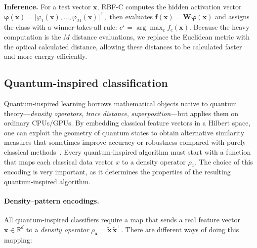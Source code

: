 \documentclass[twocolumn]{article} %
\begin{document}
\smallskip
\textbf{Inference.}
For a test vector \(\mathbf x\), RBF-C computes the hidden activation
vector
\(
  \boldsymbol\varphi(\mathbf x)=
  \bigl[\varphi_1(\mathbf x),\dots,\varphi_M(\mathbf x)\bigr]^{\!\top},
\)
then evaluates
\(
  \mathbf f(\mathbf x)=\mathbf W\boldsymbol\varphi(\mathbf x)
\)
and assigns the class with a winner-takes-all rule:
\(c^\star=\arg\max_{c}f_c(\mathbf x)\).
Because the heavy computation is the \(M\) distance evaluations, we
replace the Euclidean metric with the optical calculated distance, allowing these distances to be calculated faster and more energy-efficiently.


\subsection{Quantum-inspired classification}
\label{subsec:qic}

Quantum-inspired learning borrows mathematical objects native to
quantum theory—\emph{density operators}, \emph{trace distance},
\emph{superposition}—but applies them on ordinary CPUs/GPUs.  By
embedding classical feature vectors in a Hilbert space, one can exploit
the geometry of quantum states to obtain alternative similarity
measures that sometimes improve accuracy or robustness compared with
purely classical methods~\cite{Sergioli2025}. 
Every quantum-inspired algorithm must start with a function that maps each classical data vector $x$ to a density operator $\rho_x$.  
The choice of this encoding is very important, as it determines the properties of the resulting quantum-inspired algorithm.  

\paragraph{Density--pattern encodings.}\label{par:encodings}
All quantum-inspired classifiers require a map that
sends a real feature vector \(\mathbf x\in\mathbb R^{d}\) to a
\emph{density operator}
\(\rho_{\mathbf x}= \tilde{\mathbf x}\,
                    \tilde{\mathbf x}^{\!\top}\). There are different ways of doing this mapping:
\end{document}
